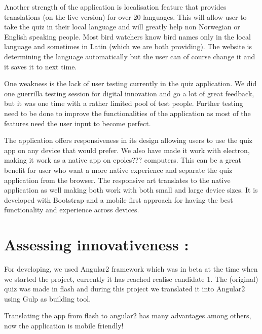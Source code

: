 Another strength of the application is localisation feature that provides translations (on the live version) for over 20 languages. This will allow user to take the quiz in their local language and will greatly help non Norwegian or English speaking people. Most bird watchers know bird names only in the local language and sometimes in Latin (which we are both providing). The website is determining the language automatically but the user can of course change it and it saves it to next time.

One weakness is the lack of user testing currently in the quiz application. We did one guerrilla testing session for digital innovation and go a lot of great feedback, but it was one time with a rather limited pool of test people. Further testing need to be done to improve the functionalities of the application as most of the features need the user input to become perfect. 


The application offers responsiveness in its design allowing users to use the quiz app on any device that would prefer. We also have made it work with electron, making it work as a native app on epoles??? computers. This can be a great benefit for user who want a more native experience and separate the quiz application from the browser. The responsive art translates to the native application as well making both work with both small and large device sizes. It is developed with Bootstrap and a mobile first approach for having the best functionality and experience across devices.

 
 \section{Assessing innovativeness :}
For developing, we used Angular2 framework which was in beta at the time when we started the project, currently it has reached realise candidate 1. 
The (original) quiz was made in flash and during this project we translated it into Angular2 using Gulp as building tool. \newline

Translating the app from flash to angular2 has many advantages among others, now the application is mobile friendly! 



